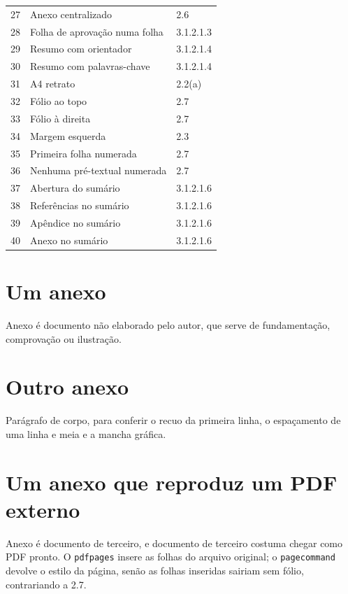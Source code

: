 \documentclass[dsc,pdfa,coorientador,numbers,twoside,orientadorexamina]{coppe}
\begin{document}
\begin{longtable}{rll}
    27 & Anexo centralizado & 2.6\\
    28 & Folha de aprovação numa folha & 3.1.2.1.3\\
    29 & Resumo com orientador & 3.1.2.1.4\\
    30 & Resumo com palavras-chave & 3.1.2.1.4\\
    31 & A4 retrato & 2.2(a)\\
    32 & Fólio ao topo & 2.7\\
    33 & Fólio à direita & 2.7\\
    34 & Margem esquerda & 2.3\\
    35 & Primeira folha numerada & 2.7\\
    36 & Nenhuma pré-textual numerada & 2.7\\
    37 & Abertura do sumário & 3.1.2.1.6\\
    38 & Referências no sumário & 3.1.2.1.6\\
    39 & Apêndice no sumário & 3.1.2.1.6\\
    40 & Anexo no sumário & 3.1.2.1.6\\
  \end{longtable}

  \annex
  \chapter{Um anexo}
  Anexo é documento não elaborado pelo autor, que serve de fundamentação, comprovação ou ilustração.
  \chapter{Outro anexo}
  Parágrafo de corpo, para conferir o recuo da primeira linha, o espaçamento de uma linha e meia e a mancha gráfica.
  \chapter{Um anexo que reproduz um PDF externo}
  Anexo é documento de terceiro, e documento de terceiro costuma chegar
  como PDF pronto. O \texttt{pdfpages} insere as folhas do arquivo
  original; o \texttt{pagecommand} devolve o estilo da página, senão as
  folhas inseridas sairiam sem fólio, contrariando a 2.7.
  

  \printindex
  \coppetexfinalpage
\end{document}
